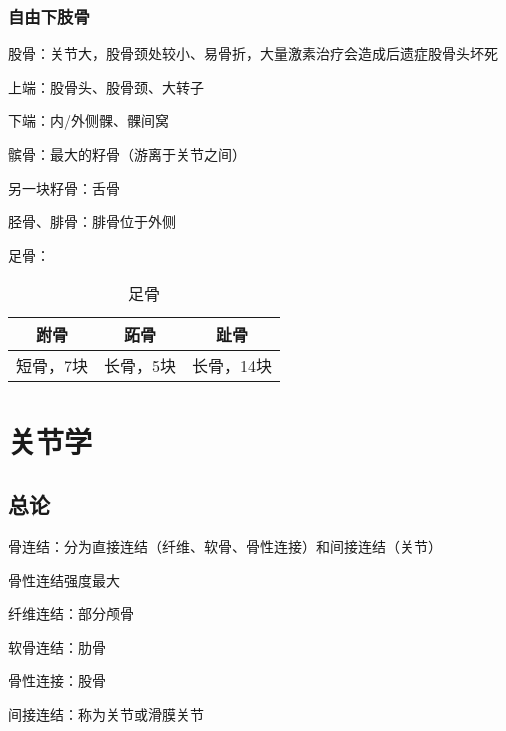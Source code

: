 \subsubsection*{自由下肢骨}%
\label{subsub:自由下肢骨}
\begin{notation}
    股骨：关节大，股骨颈处较小、易骨折，大量激素治疗会造成后遗症股骨头坏死

    上端：股骨头、股骨颈、大转子

    下端：内/外侧髁、髁间窝
\end{notation}
\begin{notation}
    髌骨：最大的籽骨（游离于关节之间）

    另一块籽骨：舌骨
\end{notation}
\begin{notation}
    胫骨、腓骨：腓骨位于外侧
\end{notation}
\begin{notation}
    足骨：
    \begin{table}[htpb]
        \centering
        \caption{足骨}
        \label{tab:足骨}
        \begin{tabular}{ccc}
        \toprule
        跗骨 & 跖骨 & 趾骨\\
        \midrule
        短骨，7块 & 长骨，5块 & 长骨，14块\\
        \bottomrule
        \end{tabular}
    \end{table}
\end{notation}
\section{关节学}%
\label{sec:关节学}
\subsection{总论}%
\label{sub:总论}
\begin{notation}
    骨连结：分为直接连结（纤维、软骨、骨性连接）和间接连结（关节）

    骨性连结强度最大

    纤维连结：部分颅骨

    软骨连结：肋骨

    骨性连接：股骨
\end{notation}
间接连结：称为关节或滑膜关节

